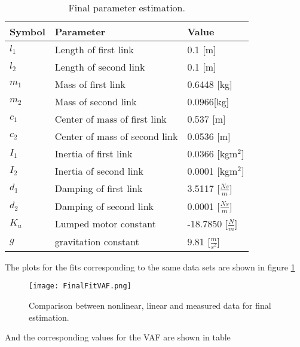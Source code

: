 \documentclass[main.tex]{subfiles}
\begin{document}
\begin{table}[H]
\caption{Final parameter estimation.}
\centering
\begin{tabular}{|l|l|l|}
\hline
Symbol &Parameter &Value \\ \hline
$l_1$ &Length of first link &0.1 [m] \\ 
$l_2$ &Length of second link &0.1 [m]\\ 
$m_1$ &Mass of first link &0.6448 [kg]\\ 
$m_2$ &Mass of second link &0.0966[kg]\\ 
$c_1$ &Center of mass of first link &0.537 [m]\\ 
$c_2$ &Center of mass of second link &0.0536 [m]\\ 
$I_1$ &Inertia of first link &0.0366 [kgm$^2$]\\ 
$I_2$ &Inertia of second link &0.0001 [kgm$^2$]\\
$d_1$ &Damping of first link &3.5117 [$\frac{Ns}{m}$]\\
$d_2$ &Damping of second link &0.0001 [$\frac{Ns}{m}$]\\
$K_u$ &Lumped motor constant &-18.7850 [$\frac{N}{m}$]\\
$g$ & gravitation constant & 9.81 [$\frac{m}{s^2}$]\\ \hline
\end{tabular}
\label{tab:FinalPar}
\end{table} 

The plots for the fits corresponding to the same data sets are shown in figure \ref{fig:FinalFitVAF}

\begin{figure}[H]
\centering
\texttt{[image: FinalFitVAF.png]}
\caption{\label{fig:FinalFitVAF}Comparison between nonlinear, linear and measured data for final estimation.}
\end{figure}

And the corresponding values for the VAF are shown in table
\end{document}
